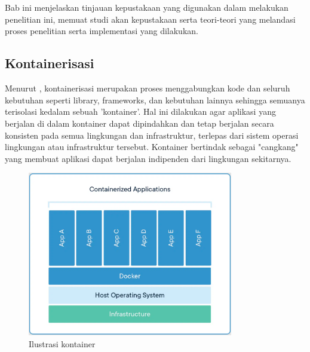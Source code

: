 \chapter{\babDua}
\label{bab:2}
Bab ini menjelaskan tinjauan kepustakaan yang digunakan dalam melakukan
penelitian ini, memuat studi akan kepustakaan serta teori-teori yang melandasi proses penelitian serta implementasi yang dilakukan.

\section{Kontainerisasi}
\label{sec:kontainerisasiDocker}
Menurut \cite{containerization}, kontainerisasi merupakan proses menggabungkan kode dan seluruh kebutuhan seperti library, frameworks, dan kebutuhan lainnya sehingga semuanya terisolasi kedalam sebuah 'kontainer'. Hal ini dilakukan agar aplikasi yang berjalan di dalam kontainer dapat dipindahkan dan tetap berjalan secara konsisten pada semua lingkungan dan infrastruktur, terlepas dari sistem operasi lingkungan atau infrastruktur tersebut. Kontainer bertindak sebagai "cangkang" yang membuat aplikasi dapat berjalan indipenden dari lingkungan sekitarnya.
\begin{figure}
	\centering
	\includegraphics[width=0.8\textwidth]{pics/kontainerIlust.png}
	\caption{Ilustrasi kontainer \citep{docker_2022}}
	\label{fig:kontainer}
\end{figure}


